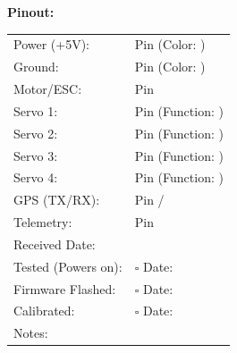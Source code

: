 \documentclass[10pt,letterpaper]{article}
\begin{document}
\textbf{Pinout:}
\begin{tabularx}{\textwidth}{lX}
Power (+5V): & Pin \underline{\hspace{1cm}} (Color: \underline{\hspace{2cm}}) \\
Ground: & Pin \underline{\hspace{1cm}} (Color: \underline{\hspace{2cm}}) \\
Motor/ESC: & Pin \underline{\hspace{1cm}} \\
Servo 1: & Pin \underline{\hspace{1cm}} (Function: \underline{\hspace{3cm}}) \\
Servo 2: & Pin \underline{\hspace{1cm}} (Function: \underline{\hspace{3cm}}) \\
Servo 3: & Pin \underline{\hspace{1cm}} (Function: \underline{\hspace{3cm}}) \\
Servo 4: & Pin \underline{\hspace{1cm}} (Function: \underline{\hspace{3cm}}) \\
GPS (TX/RX): & Pin \underline{\hspace{1cm}} / \underline{\hspace{1cm}} \\
Telemetry: & Pin \underline{\hspace{1cm}} \\[0.5em]
Received Date: & \underline{\hspace{4cm}} \\
Tested (Powers on): & $\square$ \quad Date: \underline{\hspace{3cm}} \\
Firmware Flashed: & $\square$ \quad Date: \underline{\hspace{3cm}} \\
Calibrated: & $\square$ \quad Date: \underline{\hspace{3cm}} \\
Notes: & \underline{\hspace{10cm}} \\
\end{tabularx}

\newpage
\end{document}
